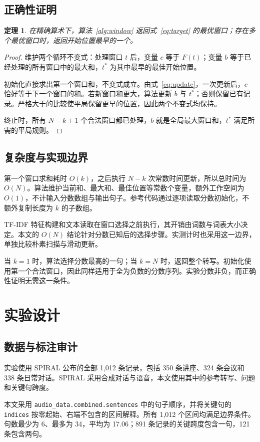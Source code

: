 \documentclass[10pt,journal,compsoc]{IEEEtran}
\newtheorem{theorem}{定理}
\begin{document}
\subsection{正确性证明}
\begin{theorem}
在精确算术下，算法~\ref{alg:window} 返回式~\eqref{eq:target} 的最优窗口；存在多个最优窗口时，返回开始位置最早的一个。
\end{theorem}
\begin{proof}
维护两个循环不变式：处理窗口 $t$ 后，变量 $c$ 等于 $F(t)$；变量 $b$ 等于已经处理的所有窗口中的最大和，$t^*$ 为其中最早的最佳开始位置。

初始化直接求出第一个窗口和，不变式成立。由式~\eqref{eq:update}，一次更新后，$c$ 恰好等于下一个窗口的和。若新窗口和更大，算法更新 $b$ 与 $t^*$；否则保留已有记录。严格大于的比较使平局保留更早的位置，因此两个不变式均保持。

终止时，所有 $N-k+1$ 个合法窗口都已处理，$b$ 就是全局最大窗口和，$t^*$ 满足所需的平局规则。
\end{proof}

\subsection{复杂度与实现边界}
第一个窗口求和耗时 $O(k)$，之后执行 $N-k$ 次常数时间更新，所以总时间为 $O(N)$。算法维护当前和、最大和、最佳位置等常数个变量，额外工作空间为 $O(1)$，不计输入分数数组与输出句子。参考代码通过逐项读取分数初始化，不额外复制长度为 $k$ 的子数组。

TF-IDF 特征构建和文本读取在窗口选择之前执行，其开销由词数与词表大小决定。本文的 $O(N)$ 结论针对分数已知后的选择步骤。实测计时也采用这一边界，单独比较朴素扫描与滑动更新。

当 $k=1$ 时，算法选择分数最高的一句；当 $k=N$ 时，返回整个转写。初始化使用第一个合法窗口，因此同样适用于全为负数的分数序列。实验分数非负，而正确性证明无需这一条件。

\section{实验设计}
\subsection{数据与标注审计}
实验使用 SPIRAL 公布的全部 1,012 条记录\cite{lin2025speechprune}，包括 350 条讲座、324 条会议和 338 条日常对话。SPIRAL 采用合成对话与语音，本文使用其中的参考转写、问题和关键句跨度。

本文采用 \texttt{audio\_data.combined.sentences} 中的句子顺序，并将关键句的 \texttt{indices} 按零起始、右端不包含的区间解释。所有 1,012 个区间均满足边界条件。句数最少为 6、最多为 34，平均为 17.06；891 条记录的关键跨度包含一句，121 条包含两句。
\end{document}
